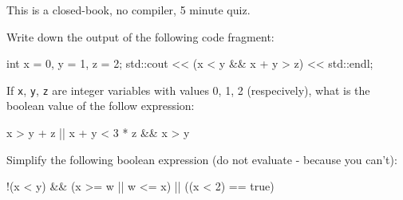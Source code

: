 

This is a closed-book, no compiler, 5 minute quiz.

\nextq
Write down the output of the following code fragment:
\begin{console}
int x = 0, y = 1, z = 2;
std::cout << (x < y && x + y > z) << std::endl;
\end{console}
\ANSWER
\begin{answercode}

\end{answercode}

\nextq
If \verb!x!, \verb!y!, \verb!z! are integer variables with values 0, 1, 2
(respecively),
what is the boolean value of the follow expression:
\begin{console}
x > y + z || x + y < 3 * z && x > y
\end{console}
\ANSWER
\begin{answercode}

\end{answercode}

\nextq
Simplify the following boolean expression (do not evaluate - because you can't):
\begin{console}
!(x < y) && (x >= w || w <= x) || ((x < 2) == true)
\end{console}
\ANSWER
\begin{answercode}

\end{answercode}

